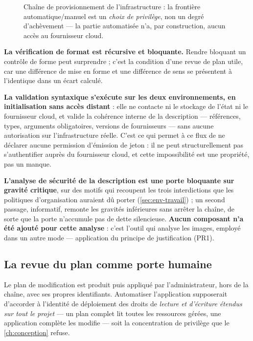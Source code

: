 \begin{figure}[htbp]
\begin{tikzpicture}
\end{tikzpicture}
\caption[Chaîne de provisionnement de l'infrastructure]{Chaîne de provisionnement de
l'infrastructure : la frontière automatique/manuel est un \emph{choix de privilège}, non un
degré d'achèvement --- la partie automatisée n'a, par construction, aucun accès au
fournisseur cloud.}
\label{fig:chaine-infrastructure}
\end{figure}

\textbf{La vérification de format est récursive et bloquante.} Rendre bloquant un contrôle de forme
peut surprendre ; c'est la condition d'une revue de plan utile, car une différence de mise en forme
et une différence de sens se présentent à l'identique dans un écart calculé.

\textbf{La validation syntaxique s'exécute sur les deux environnements, en initialisation sans
accès distant} : elle ne contacte ni le stockage de l'état ni le fournisseur cloud, et valide la
cohérence interne de la description --- références, types, arguments obligatoires, versions de
fournisseurs --- sans aucune autorisation sur l'infrastructure réelle. C'est ce qui permet à ce flux
de ne déclarer aucune permission d'émission de jeton : il ne peut structurellement pas
s'authentifier auprès du fournisseur cloud, et cette impossibilité est une propriété, pas un manque.

\textbf{L'analyse de sécurité de la description est une porte bloquante sur gravité critique}, sur
des motifs qui recoupent les trois interdictions que les politiques d'organisation auraient dû
porter (\cref{sec:env-travail}) ; un second passage, informatif, remonte les gravités inférieures
sans arrêter la chaîne, de sorte que la porte n'accumule pas de dette silencieuse. \textbf{Aucun
composant n'a été ajouté pour cette analyse} : c'est l'outil qui analyse les images, employé dans un
autre mode --- application du principe de justification (PR1).

\subsection{La revue du plan comme porte humaine}

Le plan de modification est produit puis appliqué par l'administrateur, hors de la chaîne, avec ses
propres identifiants. Automatiser l'application supposerait d'accorder à l'identité de déploiement
des droits de \emph{lecture et d'écriture étendus sur tout le projet} --- un plan complet lit toutes
les ressources gérées, une application complète les modifie --- soit la concentration de privilège
que le \cref{ch:conception} refuse.

